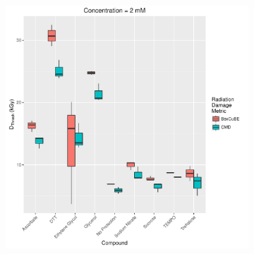 \begin{figure}
\begin{subfigure}[b]{0.75\textwidth}
            \includegraphics[width=\textwidth]{figures/saxs/Conc_2_dose.pdf}
            \caption{}
            \label{fig:SAXS Metric comparison - 2mM}
    \end{subfigure}
\end{figure}
